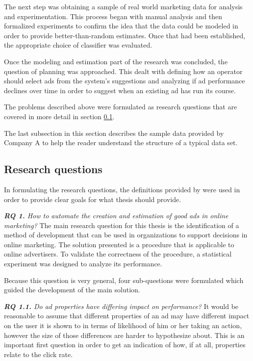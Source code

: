 \documentclass{sig-alternate}
\begin{document}
The next step was obtaining a sample of real world marketing data for analysis and experimentation. This process began with manual analysis and then formalized experiments to confirm the idea that the data could be modeled in order to provide better-than-random estimates. Once that had been established, the appropriate choice of classifier was evaluated.

Once the modeling and estimation part of the research was concluded, the question of planning was approached. This dealt with defining how an operator should select ads from the system's suggestions and analyzing if ad performance declines over time in order to suggest when an existing ad has run its course.

The problems described above were formulated as research questions that are covered in more detail in section \ref{sec:ResearchQuestions}.

The last subsection in this section describes the sample data provided by Company A to help the reader understand the structure of a typical data set.

\subsection{Research questions}
\label{sec:ResearchQuestions}
In formulating the research questions, the definitions provided by \cite{Shaw2002} were used in order to provide clear goals for what thesis should provide.

\textit{\textbf{RQ 1.} How to automate the creation and estimation of good ads in online marketing?}
The main research question for this thesis is the identification of a method of development that can be used in organizations to support decisions in online marketing. The solution presented is a procedure that is applicable to online advertisers. To validate the correctness of the procedure, a statistical experiment was designed to analyze its performance.

Because this question is very general, four sub-questions were formulated which guided the development of the main solution.

\textit{\textbf{RQ 1.1.} Do ad properties have differing impact on performance?}
It would be reasonable to assume that different properties of an ad may have different impact on the user it is shown to in terms of likelihood of him or her taking an action, however the size of those differences are harder to hypothesize about. This is an important first question in order to get an indication of how, if at all, properties relate to the click rate.
\end{document}
